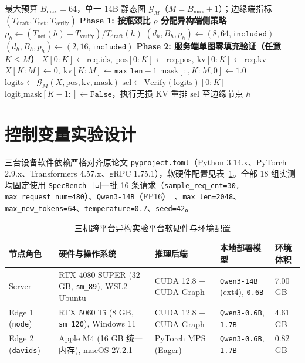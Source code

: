 \documentclass[conference]{IEEEtran}
\begin{document}
\begin{algorithm}[t]
\caption{异构感知配置与 Variable-Budget 零填充验证}
\label{alg:varbudget}
\begin{algorithmic}[1]
\REQUIRE 最大预算 $B_{\max}{=}64$，单一 14B 静态图 $\mathcal{G}_{M}$（$M{=}B_{\max}{+}1$）；边缘端指标 $(T_{\text{draft}}, T_{\text{net}}, T_{\text{verify}})$
\STATE \textbf{Phase 1: 按瓶颈比 $\rho$ 分配异构端侧策略}
  \STATE $\rho_h \leftarrow (T_{\text{net}}(h) + T_{\text{verify}}) / T_{\text{draft}}(h)$
    \STATE $(d_h, B_h, p_h) \leftarrow (8, 64, \texttt{included})$ 
  \ELSE
    \STATE $(d_h, B_h, p_h) \leftarrow (2, 16, \texttt{included})$ 
  \ENDIF
\ENDFOR
\STATE \textbf{Phase 2: 服务端单图零填充验证（任意 $K \le M$）}
\STATE $X[0{:}K] \leftarrow \text{req.ids},\ \text{pos}[0{:}K] \leftarrow \text{req.pos},\ \text{kv}[0{:}K] \leftarrow \text{req.kv}$
  \STATE $X[K{:}M] \leftarrow 0,\ \text{kv}[K{:}M] \leftarrow \texttt{max\_len} - 1$
  \STATE $\text{mask}[:, K{:}M, 0] \leftarrow 1.0$ 
\ENDIF
\STATE $\text{logits} \leftarrow \mathcal{G}_{M}(X, \text{pos}, \text{kv}, \text{mask})$
\STATE $\text{sel} \leftarrow \text{Verify}(\text{logits})[0{:}K]$
\STATE $\text{logit\_mask}[K{-}1{:}] \leftarrow \texttt{False}$，执行无损 KV 重排
\RETURN $\text{sel}$ 至边缘节点 $h$
\end{algorithmic}
\end{algorithm}

\section{控制变量实验设计}

三台设备软件依赖严格对齐原论文 \texttt{pyproject.toml}（Python 3.14.x、PyTorch 2.9.x、Transformers 4.57.x、gRPC 1.75.1），软硬件配置见表~\ref{tab:hw}。全部 18 组实测均固定使用 \texttt{SpecBench}~\cite{liu2024specbench} 同一批 16 条请求（\texttt{sample\_req\_cnt=30, max\_request\_num=480}）、\texttt{Qwen3-14B}（FP16）~\cite{qwen3}、\texttt{max\_len=2048}、\texttt{max\_new\_tokens=64}、\texttt{temperature=0.7}、\texttt{seed=42}。

\begin{table}[t]
  \centering
  \caption{三机跨平台异构实验平台软硬件与环境配置}
  \label{tab:hw}
  \begin{tabular}{lllll}
    \toprule
    节点角色 & 硬件与操作系统 & 推理后端 & 本地部署模型 & 环境体积 \\
    \midrule
    Server & RTX 4080 SUPER (32 GB, \texttt{sm\_89}), WSL2 Ubuntu & CUDA 12.8 + CUDA Graph & \texttt{Qwen3-14B} (ext4), \texttt{0.6B} & 7.00 GB \\
    Edge 1 (\texttt{node}) & RTX 5060 Ti (8 GB, \texttt{sm\_120}), Windows 11 & CUDA 12.8 + CUDA Graph & \texttt{Qwen3-0.6B}, \texttt{1.7B} & 4.61 GB \\
    Edge 2 (\texttt{davids}) & Apple M4 (16 GB 统一内存), macOS 27.2.1 & PyTorch MPS (Eager) & \texttt{Qwen3-0.6B}, \texttt{1.7B} & 0.82 GB \\
    \bottomrule
  \end{tabular}
\end{table}
\end{document}
